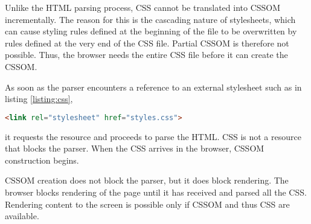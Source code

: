 


Unlike the HTML parsing process, CSS cannot be translated into CSSOM incrementally.
The reason for this is the cascading nature of stylesheets, which can cause styling rules defined at the beginning of the file to be overwritten by rules defined at the very end of the CSS file.
Partial CSSOM is therefore not possible.
Thus, the browser needs the entire CSS file before it can create the CSSOM. %



As soon as the parser encounters a reference to an external stylesheet such as in listing \ref{listing:css},

\begin{center}
\begin{lstlisting}[caption={Link to a CSS file from the main document}, label={listing:css}, language=html, numbers=none]
<link rel="stylesheet" href="styles.css">
\end{lstlisting}
\end{center}

it requests the resource and proceeds to parse the HTML.
CSS is not a resource that blocks the parser.
When the CSS arrives in the browser, CSSOM construction begins.




CSSOM creation does not block the parser, but it does block rendering.
The browser blocks rendering of the page until it has received and parsed all the CSS.
Rendering content to the screen is possible only if CSSOM and thus CSS are available. 


